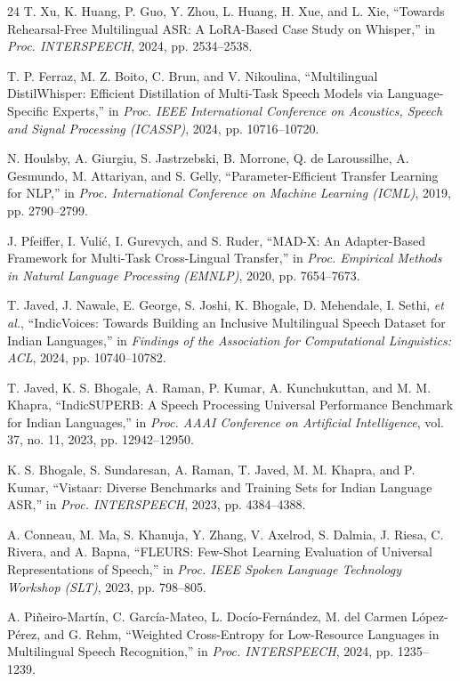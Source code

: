 \documentclass[conference]{IEEEtran}
\begin{document}
\begin{thebibliography}{24}
T. Xu, K. Huang, P. Guo, Y. Zhou, L. Huang, H. Xue, and L. Xie,
``Towards Rehearsal-Free Multilingual ASR: A LoRA-Based Case Study on
Whisper,'' in \emph{Proc. INTERSPEECH}, 2024, pp. 2534--2538.

T. P. Ferraz, M. Z. Boito, C. Brun, and V. Nikoulina, ``Multilingual
DistilWhisper: Efficient Distillation of Multi-Task Speech Models via
Language-Specific Experts,'' in \emph{Proc. IEEE International
Conference on Acoustics, Speech and Signal Processing (ICASSP)}, 2024,
pp. 10716--10720.

N. Houlsby, A. Giurgiu, S. Jastrzebski, B. Morrone, Q. de Laroussilhe,
A. Gesmundo, M. Attariyan, and S. Gelly, ``Parameter-Efficient Transfer
Learning for NLP,'' in \emph{Proc. International Conference on Machine
Learning (ICML)}, 2019, pp. 2790--2799.

J. Pfeiffer, I. Vuli\'{c}, I. Gurevych, and S. Ruder, ``MAD-X: An
Adapter-Based Framework for Multi-Task Cross-Lingual Transfer,'' in
\emph{Proc. Empirical Methods in Natural Language Processing (EMNLP)},
2020, pp. 7654--7673.

T. Javed, J. Nawale, E. George, S. Joshi, K. Bhogale, D. Mehendale,
I. Sethi, \emph{et al.},
``IndicVoices: Towards Building an Inclusive Multilingual Speech Dataset
for Indian Languages,'' in \emph{Findings of the Association for
Computational Linguistics: ACL}, 2024, pp. 10740--10782.

T. Javed, K. S. Bhogale, A. Raman, P. Kumar, A. Kunchukuttan, and
M. M. Khapra, ``IndicSUPERB: A Speech Processing Universal Performance
Benchmark for Indian Languages,'' in \emph{Proc. AAAI Conference on
Artificial Intelligence}, vol. 37, no. 11, 2023, pp. 12942--12950.

K. S. Bhogale, S. Sundaresan, A. Raman, T. Javed, M. M. Khapra, and
P. Kumar, ``Vistaar: Diverse Benchmarks and Training Sets for Indian
Language ASR,'' in \emph{Proc. INTERSPEECH}, 2023, pp. 4384--4388.

A. Conneau, M. Ma, S. Khanuja, Y. Zhang, V. Axelrod, S. Dalmia,
J. Riesa, C. Rivera, and A. Bapna, ``FLEURS: Few-Shot Learning
Evaluation of Universal Representations of Speech,'' in \emph{Proc. IEEE
Spoken Language Technology Workshop (SLT)}, 2023, pp. 798--805.

A. Pi\~{n}eiro-Mart\'{i}n, C. Garc\'{i}a-Mateo, L. Doc\'{i}o-Fern\'{a}ndez,
M. del Carmen L\'{o}pez-P\'{e}rez, and G. Rehm, ``Weighted
Cross-Entropy for Low-Resource Languages in Multilingual Speech
Recognition,'' in \emph{Proc. INTERSPEECH}, 2024, pp. 1235--1239.


\end{thebibliography}
\end{document}
